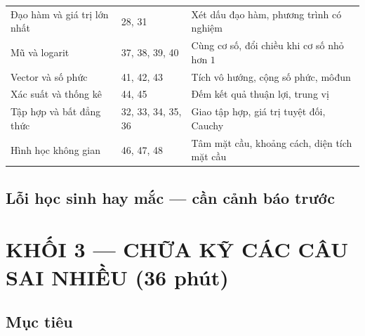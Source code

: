 \documentclass[11pt, a4paper]{article}
\begin{document}
{\begin{tabularx}{\linewidth}{@{\hspace{6pt}}llX@{\hspace{6pt}}}
Đạo hàm và giá trị lớn nhất & 28, 31 & Xét dấu đạo hàm, phương trình có nghiệm \\
Mũ và logarit & 37, 38, 39, 40 & Cùng cơ số, đổi chiều khi cơ số nhỏ hơn $1$ \\
Vector và số phức & 41, 42, 43 & Tích vô hướng, cộng số phức, môđun \\
Xác suất và thống kê & 44, 45 & Đếm kết quả thuận lợi, trung vị \\
Tập hợp và bất đẳng thức & 32, 33, 34, 35, 36 & Giao tập hợp, giá trị tuyệt đối, Cauchy \\
Hình học không gian & 46, 47, 48 & Tâm mặt cầu, khoảng cách, diện tích mặt cầu \\
\bottomrule
\end{tabularx}}

\subsection{Lỗi học sinh hay mắc — cần cảnh báo trước}


\section{KHỐI 3 — CHỮA KỸ CÁC CÂU SAI NHIỀU (36 phút)}

\subsection{Mục tiêu}
\end{document}
